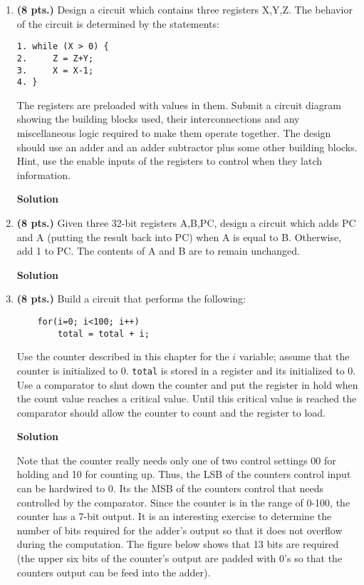 \begin{enumerate}
\item \textbf{ (8 pts.)} Design a circuit which contains three registers X,Y,Z.
The behavior of the circuit is determined by the statements:
\begin{verbatim}
1. while (X > 0) {
2.     Z = Z+Y;
3.     X = X-1;
4. } 
\end{verbatim}
The registers are preloaded with values in them.
Submit a circuit diagram showing the building blocks used,
their interconnections and any miscellaneous logic required to make
them operate together.  The design should use an adder and an
adder subtractor plus some other building blocks.  Hint, use
the enable inputs of the registers to control when they
latch information.

\begin{onlysolution}  \textbf{Solution} \itshape{
\begin{figure}[ht]
\end{figure}
} \end{onlysolution} 

\item \textbf{ (8 pts.)} Given three 32-bit registers A,B,PC, design a circuit
which adds PC and A (putting the result back into PC) when A is equal
to B.  Otherwise, add 1 to PC.  The contents of A and B
are to remain unchanged.

\begin{onlysolution}  \textbf{Solution} \itshape{
\begin{figure}[ht]
\end{figure}
} \end{onlysolution} 

\item \textbf{ (8 pts.)} Build a circuit that performs the following: 
\begin{verbatim}
    for(i=0; i<100; i++) 
        total = total + i;
\end{verbatim}
Use the counter described in this chapter for the $i$ variable; 
assume that the counter is initialized to 0. \verb^total^ is stored 
in a register and its initialized to 0.  Use a comparator to shut 
down the counter and put the register in hold when the count value 
reaches a critical value. Until this critical value is 
reached the comparator should allow the counter to count and the 
register to load.  

\begin{onlysolution}  \textbf{Solution} \itshape{
Note that the counter really needs only one of two control settings
00 for holding and 10 for counting up.  Thus, the LSB of the counters
control input can be hardwired to 0.  Its the MSB of the counters control
that needs controlled by the comparator.  Since the counter is in the
range of 0-100, the counter has a 7-bit output.  It is an interesting exercise to
determine the number of bits required for the adder's output so that it 
does not overflow during the computation.  The figure below shows that
13 bits are required (the upper six bits of the counter's output are padded
with 0's so that the counters output can be feed into the adder).

}
\end{onlysolution}
\end{enumerate}
